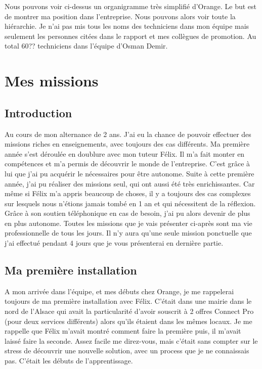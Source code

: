 \documentclass[12pt, a4paper]{article}
\begin{document}
\newpage
Nous pouvons voir ci-dessus un organigramme 
très simplifié d'Orange. Le but est de montrer
ma position dans l'entreprise. Nous pouvons alors
voir toute la hiérarchie. Je n'ai pas mis tous les 
noms des techniciens dans mon équipe mais seulement 
les personnes citées dans le rapport et mes collègues 
de promotion. Au total 60?? techniciens dans 
l'équipe d'Osman Demir. 

\newpage 
\section{Mes missions}
\subsection{Introduction}
Au cours de mon alternance de 2 ans. J'ai eu la chance
de pouvoir effectuer des missions riches en 
enseignements, avec toujours des cas différents. 
Ma première année s'est déroulée en doublure avec 
mon tuteur Félix. Il m'a fait monter en compétences
et m'a permis de découvrir le monde de l'entreprise.
C'est grâce à lui que j'ai pu acquérir le
nécessaires pour être autonome. Suite à cette première
année, j'ai pu réaliser des missions seul, qui ont aussi 
été très enrichissantes. Car même si Félix m'a appris 
beaucoup de choses, il y a toujours des cas complexes 
sur lesquels nous n'étions jamais tombé en 1 an et
qui nécessitent de la réflexion. Grâce à son soutien 
téléphonique en cas de besoin, j'ai pu alors
devenir de plus en plus autonome. Toutes les missions 
que je vais présenter ci-après sont ma vie professionnelle
de tous les jours. Il n'y aura qu'une seule mission 
ponctuelle que j'ai effectué pendant 4 jours que je 
vous présenterai en dernière partie.

\subsection{Ma première installation}
A mon arrivée dans l'équipe, et mes débuts chez Orange, 
je me rappelerai toujours de ma première installation 
avec Félix. C'était dans une mairie dans le nord
de l'Alsace qui avait la particularité d'avoir 
souscrit à 2 offres Connect Pro (pour deux services différents) 
alors qu'ils étaient dans les mêmes locaux. Je me rappelle que Félix m'avait
montré comment faire la première puis, il m'avait laissé
faire la seconde. Assez facile me direz-vous, mais
c'était sans compter sur le stress de découvrir 
une nouvelle solution, avec un process que je ne connaissais 
pas. C'était les débuts de l'apprentissage. 
\end{document}
